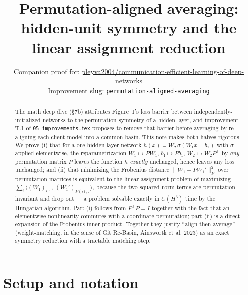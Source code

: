 \documentclass[11pt]{article}
\title{ Permutation-aligned averaging: hidden-unit symmetry and the linear assignment reduction }
\author{Companion proof for: \href{https://github.com/pleyva2004/communication-efficient-learning-of-deep-networks}{pleyva2004/communication-efficient-learning-of-deep-networks} \\ \small Improvement slug: \texttt{permutation-aligned-averaging}}
\date{}
\theoremstyle{definition}
\theoremstyle{remark}
\begin{document}
\maketitle

\begin{abstract}
The math deep dive (\S7b) attributes Figure~1's loss barrier between independently-initialized
networks to the permutation symmetry of a hidden layer, and improvement T.1 of
\texttt{05-improvements.tex} proposes to remove that barrier before averaging by re-aligning each
client model into a common basin. This note makes both halves rigorous. We prove (i) that for a
one-hidden-layer network $h(x)=W_2\,\sigma(W_1 x + b_1)$ with $\sigma$ applied elementwise, the
reparametrization $W_1\mapsto P W_1$, $b_1\mapsto P b_1$, $W_2\mapsto W_2 P^{\top}$ by \emph{any}
permutation matrix $P$ leaves the function $h$ \emph{exactly} unchanged, hence leaves any loss
unchanged; and (ii) that minimizing the Frobenius distance $\lVert W_1 - P W_1'\rVert_F^2$ over
permutation matrices is equivalent to the linear assignment problem of maximizing
$\sum_i \langle (W_1)_{i,:},\,(W_1')_{P(i),:}\rangle$, because the two squared-norm terms are
permutation-invariant and drop out --- a problem solvable exactly in $O(H^3)$ time by the Hungarian
algorithm. Part (i) follows from $P^{\top}P=I$ together with the fact that an elementwise
nonlinearity commutes with a coordinate permutation; part (ii) is a direct expansion of the
Frobenius inner product. Together they justify ``align then average'' (weight-matching, in the sense
of Git Re-Basin, Ainsworth et al. 2023) as an exact symmetry reduction with a tractable matching
step.
\end{abstract}

\section*{Setup and notation}
\end{document}
